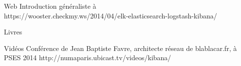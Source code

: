 Web
Introduction généraliste à \\

https://wooster.checkmy.ws/2014/04/elk-elasticsearch-logstash-kibana/

Livres


Vidéos
Conférence de Jean Baptiste Favre, architecte réseau de blablacar.fr, à PSES 2014
http://numaparis.ubicast.tv/videos/kibana/
